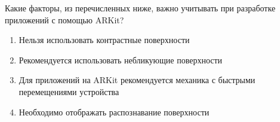 
Какие факторы, из перечисленных ниже, важно учитывать при разработке приложений с помощью ARKit?

\begin{enumerate}
    \item Нельзя использовать контрастные поверхности
    \item Рекомендуется использовать небликующие поверхности
    \item Для приложений на ARKit рекомендуется механика с быстрыми перемещениями устройства
    \item Необходимо отображать распознавание поверхности
\end{enumerate}

